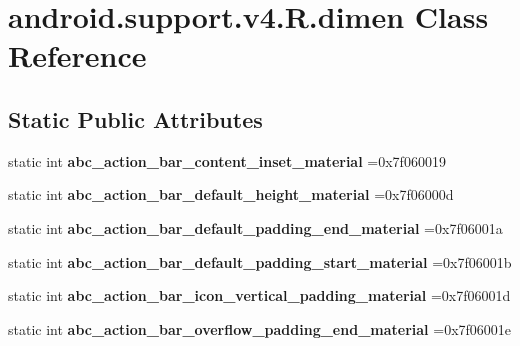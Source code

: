 \hypertarget{classandroid_1_1support_1_1v4_1_1R_1_1dimen}{}\section{android.\+support.\+v4.\+R.\+dimen Class Reference}
\label{classandroid_1_1support_1_1v4_1_1R_1_1dimen}
\subsection*{Static Public Attributes}
\begin{DoxyCompactItemize}
\item 
\mbox{\label{classandroid_1_1support_1_1v4_1_1R_1_1dimen_a3792a97c6715172a20c737c05e1cd3cf}} 
static int {\bfseries abc\+\_\+action\+\_\+bar\+\_\+content\+\_\+inset\+\_\+material} =0x7f060019
\item 
\mbox{\label{classandroid_1_1support_1_1v4_1_1R_1_1dimen_a06103a5d28fd3993956180b5f9c75ca8}} 
static int {\bfseries abc\+\_\+action\+\_\+bar\+\_\+default\+\_\+height\+\_\+material} =0x7f06000d
\item 
\mbox{\label{classandroid_1_1support_1_1v4_1_1R_1_1dimen_aab68fa5edc6c0cc92a73168b374875b5}} 
static int {\bfseries abc\+\_\+action\+\_\+bar\+\_\+default\+\_\+padding\+\_\+end\+\_\+material} =0x7f06001a
\item 
\mbox{\label{classandroid_1_1support_1_1v4_1_1R_1_1dimen_a88e7c4de1d14ab5ba19f520998246932}} 
static int {\bfseries abc\+\_\+action\+\_\+bar\+\_\+default\+\_\+padding\+\_\+start\+\_\+material} =0x7f06001b
\item 
\mbox{\label{classandroid_1_1support_1_1v4_1_1R_1_1dimen_a8bcb367e2b4a9f8f0819d3efb99d6e80}} 
static int {\bfseries abc\+\_\+action\+\_\+bar\+\_\+icon\+\_\+vertical\+\_\+padding\+\_\+material} =0x7f06001d
\item 
\mbox{\label{classandroid_1_1support_1_1v4_1_1R_1_1dimen_a42421c0b5f47cf04cb0ee9b1813d8f07}} 
static int {\bfseries abc\+\_\+action\+\_\+bar\+\_\+overflow\+\_\+padding\+\_\+end\+\_\+material} =0x7f06001e

\end{DoxyCompactItemize}
